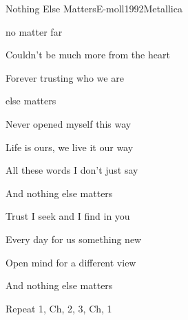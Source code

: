 \begin{song}{Nothing Else Matters}{E-moll}{1992}{Metallica}{}{}
  \begin{SBVerse}
     no matter  far 

    Couldn't be much more from the heart

    Forever trusting who we are

      else matters 
  \end{SBVerse}
  \begin{SBVerse}
    Never opened myself this way

    Life is ours, we live it our way

    All these words I don't just say

    And nothing else matters
  \end{SBVerse}
  \begin{SBVerse}
    Trust I seek and I find in you

    Every day for us something new

    Open mind for a different view

    And nothing else matters
  \end{SBVerse}
  \begin{SBChorus}
      

      

       
  \end{SBChorus}
  \begin{SBBracket}{Repeat}
    1, Ch, 2, 3, Ch, 1
  \end{SBBracket}
\end{song}
